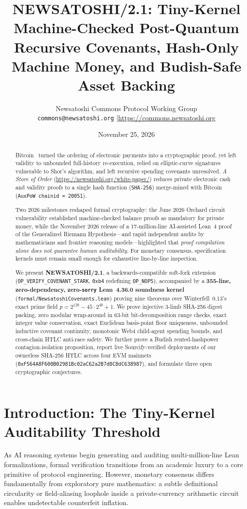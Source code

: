 \documentclass[11pt,a4paper]{article}
\title{\textbf{NEWSATOSHI/2.1: Tiny-Kernel Machine-Checked Post-Quantum Recursive Covenants, Hash-Only Machine Money, and Budish-Safe Asset Backing}}
\author{Newsatoshi Commons Protocol Working Group\\\texttt{commons@newsatoshi.org} \quad|\quad \url{https://commons.newsatoshi.org}}
\date{November 25, 2026}
\begin{document}
\maketitle

\begin{abstract}
Bitcoin~\cite{nakamoto2008} turned the ordering of electronic payments into a cryptographic proof, yet left validity to unbounded full-history re-execution, relied on elliptic-curve signatures vulnerable to Shor's algorithm, and left recursive spending covenants unresolved. \emph{A Store of Order} (\url{https://newsatoshi.org/white-paper/}) reduces private electronic cash and validity proofs to a single hash function (\texttt{SHA-256}) merge-mined with Bitcoin (\texttt{AuxPoW chainid = 20051}).

Two 2026 milestones reshaped formal cryptography: the June 2026 Orchard circuit vulnerability established machine-checked balance proofs as mandatory for private money, while the November 2026 release of a 17-million-line AI-assisted Lean~4 proof of the Generalized Riemann Hypothesis---and rapid independent audits by mathematicians and frontier reasoning models---highlighted that \emph{proof compilation alone does not guarantee human auditability}. For monetary consensus, specification kernels must remain small enough for exhaustive line-by-line inspection.

We present \textbf{NEWSATOSHI/2.1}, a backwards-compatible soft-fork extension (\texttt{OP\_VERIFY\_COVENANT\_STARK}, \texttt{0xb4} redefining \texttt{OP\_NOP5}), accompanied by a \textbf{355-line, zero-dependency, zero-\texttt{sorry} Lean~4.36.0 soundness kernel} (\texttt{formal/NewsatoshiCovenants.lean}) proving nine theorems over Winterfell~0.13's exact prime field $p = 2^{128} - 45\cdot 2^{40} + 1$. We prove injective 3-limb SHA-256 digest packing, zero modular wrap-around in 63-bit bit-decomposition range checks, exact integer value conservation, exact Euclidean basis-point floor uniqueness, unbounded inductive covenant continuity, monotonic Web4 child-agent spending bounds, and cross-chain HTLC anti-race safety. We further prove a Budish rented-hashpower contagion-isolation proposition, report live Sourcify-verified deployments of our ownerless SHA-256 HTLC across four EVM mainnets (\texttt{0xF564A8F600B02981Bc02aC62a2B7d0C8dC638987}), and formulate three open cryptographic conjectures.
\end{abstract}

\section{Introduction: The Tiny-Kernel Auditability Threshold}
As AI reasoning systems begin generating and auditing multi-million-line Lean formalizations, formal verification transitions from an academic luxury to a core primitive of protocol engineering. However, monetary consensus differs fundamentally from exploratory pure mathematics: a subtle definitional circularity or field-aliasing loophole inside a private-currency arithmetic circuit enables undetectable counterfeit inflation.
\end{document}
